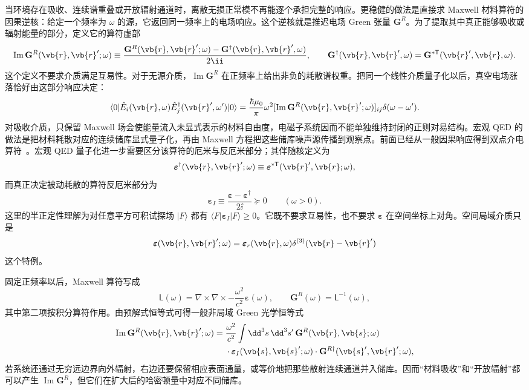 当环境存在吸收、连续谱重叠或开放辐射通道时，离散无损正常模不再能逐个承担完整的响应。更稳健的做法是直接求 Maxwell 材料算符的因果逆核：给定一个频率为 $\omega$ 的源，它返回同一频率上的电场响应。这个逆核就是推迟电场 Green 张量 $\mathbf G^R$。为了提取其中真正能够吸收或辐射能量的部分，定义它的算符虚部
\[
\operatorname{Im}\mathbf G^R(\vb{r},\vb{r}';\omega)
\equiv
\frac{\mathbf G^R(\vb{r},\vb{r}';\omega)
-\mathbf G^{\dagger}(\vb{r},\vb{r}',\omega)}{2\ii},
\qquad
\mathbf G^{\dagger}(\vb{r},\vb{r}',\omega)
=\mathbf G^{*\mathsf T}(\vb{r}',\vb{r},\omega).
\]
这个定义不要求介质满足互易性。对于无源介质，$\operatorname{Im}\mathbf G^R$ 在正频率上给出非负的耗散谱权重。把同一个线性介质量子化以后，真空电场涨落恰好由这部分响应决定：
\begin{equation}
{
\langle0|
\hat E_i(\vb{r},\omega)
\hat E_j^{\dagger}(\vb{r}',\omega')|0\rangle
=
\frac{\hbar\mu_0}{\pi}\omega^2
[\operatorname{Im}\mathbf G^R(\vb{r},\vb{r}';\omega)]_{ij}
\delta(\omega-\omega').}
\label{eq:macroscopic_qed_fdt_green_tensor}
\end{equation}
对吸收介质，只保留 Maxwell 场会使能量流入未显式表示的材料自由度，电磁子系统因而不能单独维持封闭的正则对易结构。宏观 QED 的做法是把材料耗散对应的连续储库显式量子化，再由 Maxwell 方程把这些储库噪声源传播到观察点。前面已经从一般因果响应得到双点介电算符~。宏观 QED 量子化进一步需要区分该算符的厄米与反厄米部分；其伴随核定义为
\[
\boldsymbol\varepsilon^{\dagger}(\vb{r},\vb{r}';\omega)
\equiv
\boldsymbol\varepsilon^{*\mathsf T}(\vb{r}',\vb{r};\omega),
\]
而真正决定被动耗散的算符反厄米部分为
\begin{equation}
{
\boldsymbol\varepsilon_I
\equiv
\frac{\boldsymbol\varepsilon-\boldsymbol\varepsilon^\dagger}{2\ii}
\succeq0
\qquad (\omega>0).}
\label{eq:nonlocal_permittivity_dissipative_part}
\end{equation}
这里的半正定性理解为对任意平方可积试探场 $|F\rangle$ 都有
$\langle F|\boldsymbol\varepsilon_I|F\rangle\ge0$。它既不要求互易性，也不要求
$\boldsymbol\varepsilon$ 在空间坐标上对角。空间局域介质只是
\[
\boldsymbol\varepsilon(\vb{r},\vb{r}';\omega)
=\boldsymbol\varepsilon_r(\vb{r},\omega)
\delta^{(3)}(\vb{r}-\vb{r}')
\]
这个特例。

固定正频率以后，Maxwell 算符写成
\[
\mathsf L(\omega)
=\nabla\times\nabla\times
-\frac{\omega^2}{c^2}\boldsymbol\varepsilon(\omega),
\qquad
\mathbf G^R(\omega)=\mathsf L^{-1}(\omega),
\]
其中第二项按积分算符作用。由预解式恒等式可得一般非局域 Green 光学恒等式
\begin{equation}
{
\begin{aligned}
\operatorname{Im}\mathbf G^R(\vb{r},\vb{r}';\omega)
={}&\frac{\omega^2}{c^2}
\int\dd^3s\,\dd^3s'\,
\mathbf G^R(\vb{r},\vb{s};\omega)\\
&\cdot\boldsymbol\varepsilon_I(\vb{s},\vb{s}';\omega)
\cdot\mathbf G^{R\dagger}(\vb{s}',\vb{r}';\omega),
\end{aligned}}
\label{eq:nonlocal_green_optical_identity}
\end{equation}
若系统还通过无穷远边界向外辐射，右边还要保留相应表面通量，或等价地把那些散射连续通道并入储库。因而“材料吸收”和“开放辐射”都可以产生
$\operatorname{Im}\mathbf G^R$，但它们在扩大后的哈密顿量中对应不同储库。

